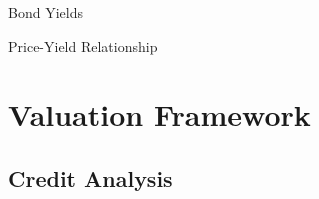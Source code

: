 \documentclass[10pt]{article}
\begin{document}
    \begin{core}{Bond Yields}




    \end{core}

    \begin{core}{Price-Yield Relationship}




    \end{core}

\section{Valuation Framework}

  \subsection{Credit Analysis}
\end{document}
